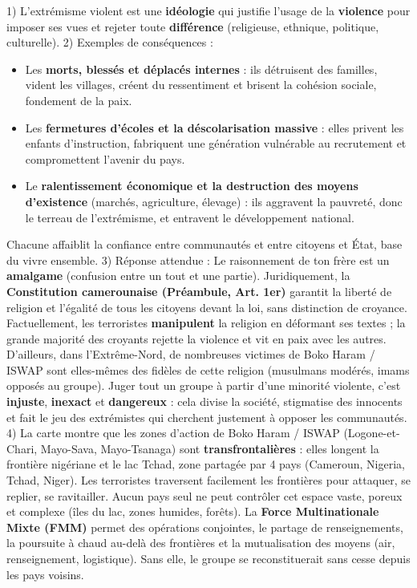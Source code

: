 \documentclass[11pt]{article}
\begin{document}
\begin{corrige}
1) L'extrémisme violent est une \textbf{idéologie} qui justifie l'usage de la \textbf{violence} pour imposer ses vues et rejeter toute \textbf{différence} (religieuse, ethnique, politique, culturelle).
2) Exemples de conséquences :
   \begin{itemize}
   \item Les \textbf{morts, blessés et déplacés internes} : ils détruisent des familles, vident les villages, créent du ressentiment et brisent la cohésion sociale, fondement de la paix.
   \item Les \textbf{fermetures d'écoles et la déscolarisation massive} : elles privent les enfants d'instruction, fabriquent une génération vulnérable au recrutement et compromettent l'avenir du pays.
   \item Le \textbf{ralentissement économique et la destruction des moyens d'existence} (marchés, agriculture, élevage) : ils aggravent la pauvreté, donc le terreau de l'extrémisme, et entravent le développement national.
   \end{itemize}
   Chacune affaiblit la confiance entre communautés et entre citoyens et État, base du vivre ensemble.
3) Réponse attendue : Le raisonnement de ton frère est un \textbf{amalgame} (confusion entre un tout et une partie). Juridiquement, la \textbf{Constitution camerounaise (Préambule, Art. 1er)} garantit la liberté de religion et l'égalité de tous les citoyens devant la loi, sans distinction de croyance. Factuellement, les terroristes \textbf{manipulent} la religion en déformant ses textes ; la grande majorité des croyants rejette la violence et vit en paix avec les autres. D'ailleurs, dans l'Extrême-Nord, de nombreuses victimes de Boko Haram / ISWAP sont elles-mêmes des fidèles de cette religion (musulmans modérés, imams opposés au groupe). Juger tout un groupe à partir d'une minorité violente, c'est \textbf{injuste}, \textbf{inexact} et \textbf{dangereux} : cela divise la société, stigmatise des innocents et fait le jeu des extrémistes qui cherchent justement à opposer les communautés.
4) La carte montre que les zones d'action de Boko Haram / ISWAP (Logone-et-Chari, Mayo-Sava, Mayo-Tsanaga) sont \textbf{transfrontalières} : elles longent la frontière nigériane et le lac Tchad, zone partagée par 4 pays (Cameroun, Nigeria, Tchad, Niger). Les terroristes traversent facilement les frontières pour attaquer, se replier, se ravitailler. Aucun pays seul ne peut contrôler cet espace vaste, poreux et complexe (îles du lac, zones humides, forêts). La \textbf{Force Multinationale Mixte (FMM)} permet des opérations conjointes, le partage de renseignements, la poursuite à chaud au-delà des frontières et la mutualisation des moyens (air, renseignement, logistique). Sans elle, le groupe se reconstituerait sans cesse depuis les pays voisins.
\end{corrige}
\end{document}
